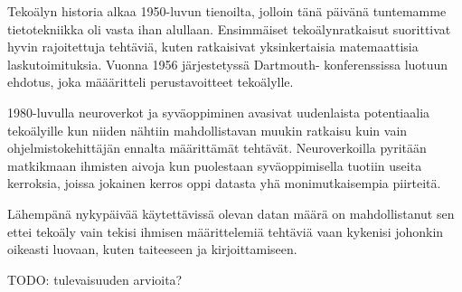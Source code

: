 Tekoälyn historia alkaa 1950-luvun tienoilta, jolloin tänä päivänä tuntemamme
tietotekniikka oli vasta ihan alullaan. Ensimmäiset tekoälynratkaisut
suorittivat hyvin rajoitettuja tehtäviä, kuten ratkaisivat yksinkertaisia
matemaattisia laskutoimituksia. Vuonna 1956 järjestetyssä Dartmouth-
konferenssissa luotuun ehdotus, joka määäritteli perustavoitteet tekoälylle.
\parencite{alma9911564814005973}

1980-luvulla neuroverkot ja syväoppiminen avasivat uudenlaista potentiaalia
tekoälyille kun niiden nähtiin mahdollistavan muukin ratkaisu kuin vain
ohjelmistokehittäjän ennalta määrittämät tehtävät. Neuroverkoilla pyritään
matkikmaan ihmisten aivoja kun puolestaan syväoppimisella tuotiin useita
kerroksia, joissa jokainen kerros oppi datasta yhä monimutkaisempia piirteitä.
\parencite{alma9911564814005973}

Lähempänä nykypäivää käytettävissä olevan datan määrä on mahdollistanut sen
ettei tekoäly vain tekisi ihmisen määrittelemiä tehtäviä vaan kykenisi johonkin
oikeasti luovaan, kuten taiteeseen ja kirjoittamiseen.
\parencite{alma9911564814005973}

TODO: tulevaisuuden arvioita?
